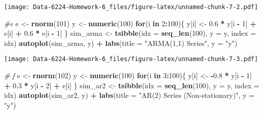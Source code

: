 \documentclass[
]{article}
\newenvironment{Shaded}{\begin{snugshade}}{\end{snugshade}}
\newcommand{\AttributeTok}[1]{\textcolor[rgb]{0.13,0.29,0.53}{#1}}
\newcommand{\CommentTok}[1]{\textcolor[rgb]{0.56,0.35,0.01}{\textit{#1}}}
\newcommand{\ControlFlowTok}[1]{\textcolor[rgb]{0.13,0.29,0.53}{\textbf{#1}}}
\newcommand{\DecValTok}[1]{\textcolor[rgb]{0.00,0.00,0.81}{#1}}
\newcommand{\FloatTok}[1]{\textcolor[rgb]{0.00,0.00,0.81}{#1}}
\newcommand{\FunctionTok}[1]{\textcolor[rgb]{0.13,0.29,0.53}{\textbf{#1}}}
\newcommand{\NormalTok}[1]{#1}
\newcommand{\OtherTok}[1]{\textcolor[rgb]{0.56,0.35,0.01}{#1}}
\newcommand{\SpecialCharTok}[1]{\textcolor[rgb]{0.81,0.36,0.00}{\textbf{#1}}}
\newcommand{\StringTok}[1]{\textcolor[rgb]{0.31,0.60,0.02}{#1}}
\begin{document}
\texttt{[image: Data-6224-Homework-6\_files/figure-latex/unnamed-chunk-7-2.pdf]}

\begin{Shaded}
\begin{Highlighting}[]
\CommentTok{\#e}
\NormalTok{e }\OtherTok{\textless{}{-}} \FunctionTok{rnorm}\NormalTok{(}\DecValTok{101}\NormalTok{)}
\NormalTok{y }\OtherTok{\textless{}{-}} \FunctionTok{numeric}\NormalTok{(}\DecValTok{100}\NormalTok{)}
\ControlFlowTok{for}\NormalTok{(i }\ControlFlowTok{in} \DecValTok{2}\SpecialCharTok{:}\DecValTok{100}\NormalTok{)\{}
\NormalTok{  y[i] }\OtherTok{\textless{}{-}} \FloatTok{0.6} \SpecialCharTok{*}\NormalTok{ y[i }\SpecialCharTok{{-}} \DecValTok{1}\NormalTok{] }\SpecialCharTok{+}\NormalTok{ e[i] }\SpecialCharTok{+} \FloatTok{0.6} \SpecialCharTok{*}\NormalTok{ e[i }\SpecialCharTok{{-}} \DecValTok{1}\NormalTok{]}
\NormalTok{\}}
\NormalTok{sim\_arma }\OtherTok{\textless{}{-}} \FunctionTok{tsibble}\NormalTok{(}\AttributeTok{idx =} \FunctionTok{seq\_len}\NormalTok{(}\DecValTok{100}\NormalTok{), }\AttributeTok{y =}\NormalTok{ y, }\AttributeTok{index =}\NormalTok{ idx)}
\FunctionTok{autoplot}\NormalTok{(sim\_arma, y) }\SpecialCharTok{+} \FunctionTok{labs}\NormalTok{(}\AttributeTok{title =} \StringTok{"ARMA(1,1) Series"}\NormalTok{, }\AttributeTok{y =} \StringTok{"y"}\NormalTok{)}
\end{Highlighting}
\end{Shaded}

\texttt{[image: Data-6224-Homework-6\_files/figure-latex/unnamed-chunk-7-3.pdf]}

\begin{Shaded}
\begin{Highlighting}[]
\CommentTok{\# f}
\NormalTok{e }\OtherTok{\textless{}{-}} \FunctionTok{rnorm}\NormalTok{(}\DecValTok{102}\NormalTok{)}
\NormalTok{y }\OtherTok{\textless{}{-}} \FunctionTok{numeric}\NormalTok{(}\DecValTok{100}\NormalTok{)}
\ControlFlowTok{for}\NormalTok{(i }\ControlFlowTok{in} \DecValTok{3}\SpecialCharTok{:}\DecValTok{100}\NormalTok{)\{}
\NormalTok{  y[i] }\OtherTok{\textless{}{-}} \SpecialCharTok{{-}}\FloatTok{0.8} \SpecialCharTok{*}\NormalTok{ y[i }\SpecialCharTok{{-}} \DecValTok{1}\NormalTok{] }\SpecialCharTok{+} \FloatTok{0.3} \SpecialCharTok{*}\NormalTok{ y[i }\SpecialCharTok{{-}} \DecValTok{2}\NormalTok{] }\SpecialCharTok{+}\NormalTok{ e[i]}
\NormalTok{\}}
\NormalTok{sim\_ar2 }\OtherTok{\textless{}{-}} \FunctionTok{tsibble}\NormalTok{(}\AttributeTok{idx =} \FunctionTok{seq\_len}\NormalTok{(}\DecValTok{100}\NormalTok{), }\AttributeTok{y =}\NormalTok{ y, }\AttributeTok{index =}\NormalTok{ idx)}
\FunctionTok{autoplot}\NormalTok{(sim\_ar2, y) }\SpecialCharTok{+} \FunctionTok{labs}\NormalTok{(}\AttributeTok{title =} \StringTok{"AR(2) Series (Non{-}stationary)"}\NormalTok{, }\AttributeTok{y =} \StringTok{"y"}\NormalTok{)}
\end{Highlighting}
\end{Shaded}
\end{document}
